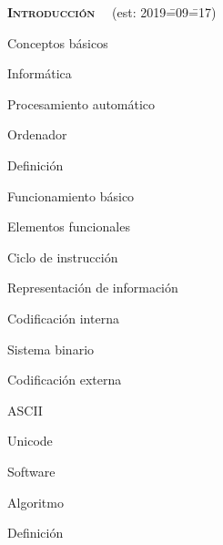 \begin{longenum}
    \item \textbf{\textsc{Introducción}} \ \ (est: 2019\==09\==17)
    \begin{longenum}
        \item Conceptos básicos
        \begin{longenum}
            \item Informática
            \begin{longenum}
                \item Procesamiento automático
            \end{longenum}
            \item Ordenador
            \begin{longenum}
                \item Definición
                \item Funcionamiento básico
                \begin{longenum}
                    \item Elementos funcionales
                    \item Ciclo de instrucción
                    \item Representación de información
                    \begin{longenum}
                        \item Codificación interna
                        \begin{longenum}
                            \item Sistema binario
                        \end{longenum}
                        \item Codificación externa
                        \begin{longenum}
                            \item ASCII
                            \item Unicode
                        \end{longenum}
                    \end{longenum}
                \end{longenum}
            \end{longenum}
            \item Software
            \item Algoritmo
            \begin{longenum}
                \item Definición

\end{longenum}
\end{longenum}
\end{longenum}
\end{longenum}
